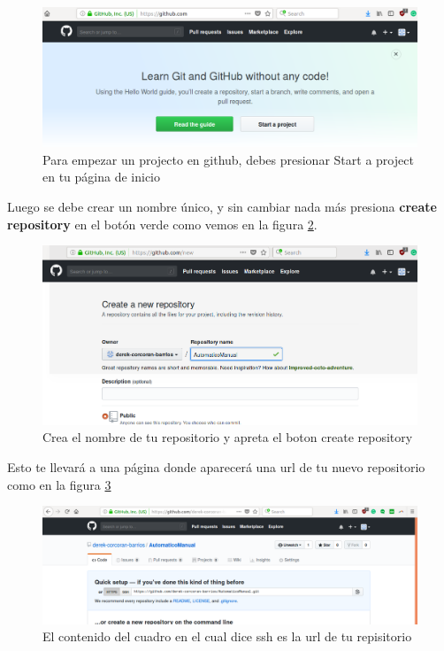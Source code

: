 \documentclass[]{book}
\begin{document}
\begin{figure}

{\centering \includegraphics[width=0.8\linewidth]{StartAProject} 

}

\caption{Para empezar un projecto en github, debes presionar Start a project en tu página de inicio}\label{fig:Start}
\end{figure}

Luego se debe crear un nombre único, y sin cambiar nada más presiona
\textbf{create repository} en el botón verde como vemos en la figura
\ref{fig:Name}.

\begin{figure}

{\centering \includegraphics[width=0.8\linewidth]{NombreRepo} 

}

\caption{Crea el nombre de tu repositorio y apreta el boton create repository}\label{fig:Name}
\end{figure}

Esto te llevará a una página donde aparecerá una url de tu nuevo
repositorio como en la figura \ref{fig:ssh}

\begin{figure}

{\centering \includegraphics[width=0.8\linewidth]{GitAdress} 

}

\caption{El contenido del cuadro en el cual dice ssh es la url de tu repisitorio}\label{fig:ssh}
\end{figure}
\end{document}
